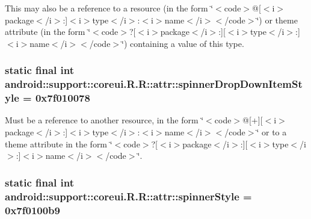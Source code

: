 This may also be a reference to a resource (in the form \char`\"{}$<$code$>$@\mbox{[}$<$i$>$package$<$/i$>$:\mbox{]}$<$i$>$type$<$/i$>$:$<$i$>$name$<$/i$>$$<$/code$>$\char`\"{}) or theme attribute (in the form \char`\"{}$<$code$>$?\mbox{[}$<$i$>$package$<$/i$>$:\mbox{]}\mbox{[}$<$i$>$type$<$/i$>$:\mbox{]}$<$i$>$name$<$/i$>$$<$/code$>$\char`\"{}) containing a value of this type. \hypertarget{classandroid_1_1support_1_1coreui_1_1_r_1_1attr_389dad7a76980d19869a46de0db6418e}{
\subsubsection[{spinnerDropDownItemStyle}]{\setlength{\rightskip}{0pt plus 5cm}static final int android::support::coreui.R.R::attr::spinnerDropDownItemStyle = 0x7f010078}}
\label{classandroid_1_1support_1_1coreui_1_1_r_1_1attr_389dad7a76980d19869a46de0db6418e}


Must be a reference to another resource, in the form \char`\"{}$<$code$>$@\mbox{[}+\mbox{]}\mbox{[}$<$i$>$package$<$/i$>$:\mbox{]}$<$i$>$type$<$/i$>$:$<$i$>$name$<$/i$>$$<$/code$>$\char`\"{} or to a theme attribute in the form \char`\"{}$<$code$>$?\mbox{[}$<$i$>$package$<$/i$>$:\mbox{]}\mbox{[}$<$i$>$type$<$/i$>$:\mbox{]}$<$i$>$name$<$/i$>$$<$/code$>$\char`\"{}. \hypertarget{classandroid_1_1support_1_1coreui_1_1_r_1_1attr_90641b87621d89f3603bc28eaf0762c1}{
\subsubsection[{spinnerStyle}]{\setlength{\rightskip}{0pt plus 5cm}static final int android::support::coreui.R.R::attr::spinnerStyle = 0x7f0100b9}}
\label{classandroid_1_1support_1_1coreui_1_1_r_1_1attr_90641b87621d89f3603bc28eaf0762c1}


